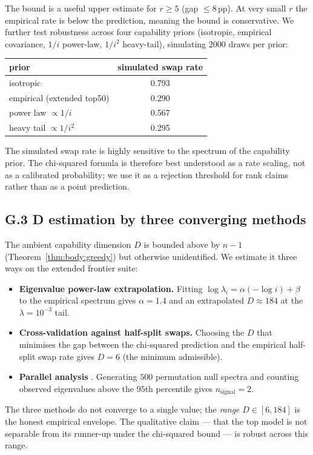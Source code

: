 \documentclass{article}
\begin{document}
\noindent The bound is a useful upper estimate for $r \ge 5$ (gap
$\le 8$\,pp). At very small $r$ the empirical rate is below the
prediction, meaning the bound is conservative. We further test
robustness across four capability priors (isotropic, empirical
covariance, $1/i$ power-law, $1/i^2$ heavy-tail), simulating
$2000$ draws per prior:

\begin{center}\small
\begin{tabular}{lc}
\toprule
prior & simulated swap rate \\
\midrule
isotropic                 & 0.793 \\
empirical (extended top50)& 0.290 \\
power law $\propto 1/i$   & 0.567 \\
heavy tail $\propto 1/i^2$& 0.295 \\
\bottomrule
\end{tabular}
\end{center}

\noindent The simulated swap rate is highly sensitive to the
spectrum of the capability prior. The chi-squared formula is therefore
best understood as a rate scaling, not as a calibrated probability;
we use it as a rejection threshold for rank claims rather than as a
point prediction.

\subsection*{G.3 D estimation by three converging methods}

The ambient capability dimension $D$ is bounded above by $n - 1$
(Theorem~\ref{thm:body:greedy}) but otherwise unidentified. We
estimate it three ways on the extended frontier suite:
\begin{itemize}
\item \textbf{Eigenvalue power-law extrapolation.} Fitting $\log
      \lambda_i = \alpha (-\log i) + \beta$ to the empirical spectrum
      gives $\alpha = 1.4$ and an extrapolated $D \approx 184$ at the
      $\lambda = 10^{-3}$ tail.
\item \textbf{Cross-validation against half-split swaps.} Choosing the
      $D$ that minimises the gap between the chi-squared prediction
      and the empirical half-split swap rate gives $D = 6$ (the
      minimum admissible).
\item \textbf{Parallel analysis} \citep{horn1965rationale}.
      Generating $500$ permutation null spectra and counting
      observed eigenvalues above the $95$th percentile gives
      $n_{\mathrm{signal}} = 2$.
\end{itemize}
The three methods do not converge to a single value; the
\emph{range} $D \in [6, 184]$ is the honest empirical envelope.
The qualitative claim --- that the top model is not separable from
its runner-up under the chi-squared bound --- is robust across this
range.
\end{document}
